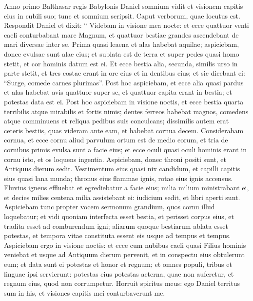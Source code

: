 \begin{biblechapter}
\begin{biblechapter}
\begin{biblechapter}
\begin{biblechapter}
\begin{biblechapter}
\begin{biblechapter}
\begin{biblechapter}
\verse Anno primo Balthasar regis Babylonis Daniel somnium vidit et visionem capitis eius in cubili suo; tunc et somnium scripsit. Caput verborum, quae locutus est. 
\verse Respondit Daniel et dixit: “ Videbam in visione mea nocte: et ecce quattuor venti caeli conturbabant mare Magnum, 
\verse et quattuor bestiae grandes ascendebant de mari diversae inter se. 
\verse Prima quasi leaena et alas habebat aquilae; aspiciebam, donec evulsae sunt alae eius; et sublata est de terra et super pedes quasi homo stetit, et cor hominis datum est ei. 
\verse Et ecce bestia alia, secunda, similis urso in parte stetit, et tres costae erant in ore eius et in dentibus eius; et sic dicebant ei: “Surge, comede carnes plurimas”. 
\verse Post hoc aspiciebam, et ecce alia quasi pardus et alas habebat avis quattuor super se, et quattuor capita erant in bestia; et potestas data est ei. 
 \verse Post hoc aspiciebam in visione noctis, et ecce bestia quarta terribilis atque mirabilis et fortis nimis; dentes ferreos habebat magnos, comedens atque comminuens et reliqua pedibus suis conculcans; dissimilis autem erat ceteris bestiis, quas videram ante eam, et habebat cornua decem. 
\verse Considerabam cornua, et ecce cornu aliud parvulum ortum est de medio eorum, et tria de cornibus primis evulsa sunt a facie eius; et ecce oculi quasi oculi hominis erant in cornu isto, et os loquens ingentia.
 \verse Aspiciebam,
 donec throni positi sunt,
 et Antiquus dierum sedit.
 Vestimentum eius quasi nix candidum,
 et capilli capitis eius quasi lana munda;
 thronus eius flammae ignis,
 rotae eius ignis accensus.
 \verse Fluvius igneus effluebat
 et egrediebatur a facie eius;
 milia milium ministrabant ei,
 et decies milies centena milia assistebant ei:
 iudicium sedit,
 et libri aperti sunt.
 \verse Aspiciebam tunc propter vocem sermonum grandium, quos cornu illud loquebatur; et vidi quoniam interfecta esset bestia, et perisset corpus eius, et tradita esset ad comburendum igni; 
\verse aliarum quoque bestiarum ablata esset potestas, et tempora vitae constituta essent eis usque ad tempus et tempus.
 \verse Aspiciebam ergo in visione noctis:
 et ecce cum nubibus caeli
 quasi Filius hominis veniebat
 et usque ad Antiquum dierum pervenit,
 et in conspectu eius obtulerunt eum;
 \verse et data sunt ei potestas et honor et regnum;
 et omnes populi, tribus et linguae
 ipsi servierunt:
 potestas eius potestas aeterna,
 quae non auferetur,
 et regnum eius, quod non corrumpetur.
 \verse Horruit spiritus meus: ego Daniel territus sum in his, et visiones capitis mei conturbaverunt me. 

\end{biblechapter}
\end{biblechapter}
\end{biblechapter}
\end{biblechapter}
\end{biblechapter}
\end{biblechapter}
\end{biblechapter}
